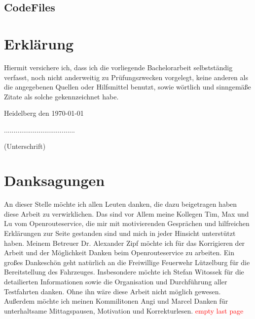\documentclass[12pt,a4paper]{article}
\newcommand\todo[1]{\textcolor{red}{#1}}
\begin{document}
\subsection*{CodeFiles}

\newpage
\section*{Erklärung}
\vspace{1cm}
Hiermit versichere ich, dass ich die vorliegende Bachelorarbeit selbstständig verfasst, noch nicht anderweitig zu Prüfungszwecken vorgelegt, keine anderen als die angegebenen Quellen oder Hilfsmittel benutzt, sowie wörtlich und sinngemäße Zitate als solche gekennzeichnet habe.\par
\bigskip

{\flushleft Heidelberg den \today } {\hfill .....................................\par}
{\hfill (Unterschrift)}

\newpage
\section*{Danksagungen}

An dieser Stelle möchte ich allen Leuten danken, die dazu beigetragen haben diese Arbeit zu verwirklichen.
\vspace{1.5cm}
Das sind vor Allem meine Kollegen Tim, Max und Lu vom Openrouteservice, die mir mit motivierenden Gesprächen und hilfreichen Erklärungen zur Seite gestanden sind und mich in jeder Hinsicht unterstützt haben.
\vspace{1.5cm}
Meinem Betreuer Dr. Alexander Zipf möchte ich für das Korrigieren der Arbeit und der Möglichkeit Danken beim Openrouteservice zu arbeiten.
\vspace{1.5cm}
Ein großes Dankeschön geht natürlich an die Freiwillige Feuerwehr Lützelburg für die Bereitstellung des Fahrzeuges.
Insbesondere möchte ich Stefan Witossek für die detailierten Informationen sowie die Organisation und Durchführung aller Testfahrten danken. Ohne ihn wäre diese Arbeit nicht möglich gewesen.
\vspace{1.5cm}
Außerdem möchte ich meinen Kommilitonen Angi und Marcel Danken für unterhaltsame Mittagspausen, Motivation und Korrekturlesen.
\newpage
\todo{empty last page}
\end{document}
